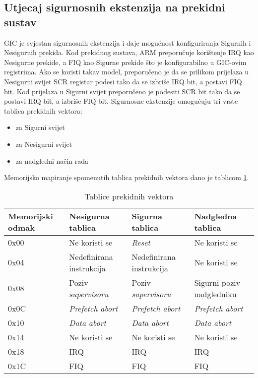 \documentclass[times, utf8, diplomski, numeric]{fer}
\begin{document}
\subsection{Utjecaj sigurnosnih ekstenzija na prekidni sustav}
GIC je svjestan sigurnosnih ekstenzija i daje mogućnost konfiguriranja Sigurnih i Nesigurnih prekida. Kod prekidnog sustava,
ARM preporučuje korištenje IRQ kao Nesigurne prekide, a FIQ kao Sigurne prekide što je konfigurabilno u GIC-ovim registrima.
Ako se koristi takav model, preporučeno je da se prilikom prijelaza u Nesigurni svijet SCR registar podesi tako da se izbriše
IRQ bit, a postavi FIQ bit. Kod prijelaza u Sigurni svijet preporučeno je podesiti SCR bit tako da se postavi IRQ bit, a
izbriše FIQ bit.
Sigurnosne ekstenzije omogućuju tri vrste tablica prekidnih vektora:
\begin{itemize}
  \item{za Sigurni svijet}
  \item{za Nesigurni svijet}
  \item{za nadgledni način rada}
\end{itemize}
Memorijsko mapiranje spomenutih tablica prekidnih vektora dano je tablicom \ref{vector_table}.
\begin{table}[H]
  \centering
  \caption{Tablice prekidnih vektora}
  \label{vector_table}
  \begin{tabular}{|| p{2cm} | p{4cm} | p{4cm} | p{4cm} ||}
    \hline
    \textbf{Memorijski odmak} & \textbf{Nesigurna tablica} & \textbf{Sigurna tablica} & \textbf{Nadgledna tablica} \\
    \hline\hline
    0x00 & Ne koristi se & \textit{Reset} & Ne koristi se\\
    \hline
    0x04 & Nedefinirana instrukcija & Nedefinirana instrukcija & Ne koristi se\\
    \hline
    0x08 & Poziv \textit{supervisoru} & Poziv \textit{supervisoru} & Sigurni poziv nadgledniku\\
    \hline
    0x0C & \textit{Prefetch abort} & \textit{Prefetch abort} & \textit{Prefetch abort}\\
    \hline
    0x10 & \textit{Data abort} & \textit{Data abort} & \textit{Data abort}\\
    \hline
    0x14 & Ne koristi se & Ne koristi se & Ne koristi se\\
    \hline
    0x18 & IRQ & IRQ & IRQ\\
    \hline
    0x1C & FIQ & FIQ & FIQ\\
    \hline
  \end{tabular}
\end{table}
\end{document}
